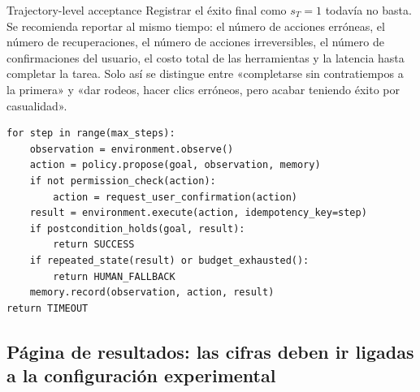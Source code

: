 






\begin{importantbox}{Trajectory-level acceptance}
Registrar el éxito final como $s_T=1$ todavía no basta. Se recomienda reportar al mismo tiempo: el número de acciones erróneas, el número de recuperaciones, el número de acciones irreversibles, el número de confirmaciones del usuario, el costo total de las herramientas y la latencia hasta completar la tarea. Solo así se distingue entre «completarse sin contratiempos a la primera» y «dar rodeos, hacer clics erróneos, pero acabar teniendo éxito por casualidad».
\end{importantbox}

\begin{lstlisting}[caption={Pseudocódigo de verificación y recuperación de trayectorias}]
for step in range(max_steps):
    observation = environment.observe()
    action = policy.propose(goal, observation, memory)
    if not permission_check(action):
        action = request_user_confirmation(action)
    result = environment.execute(action, idempotency_key=step)
    if postcondition_holds(goal, result):
        return SUCCESS
    if repeated_state(result) or budget_exhausted():
        return HUMAN_FALLBACK
    memory.record(observation, action, result)
return TIMEOUT
\end{lstlisting}

\subsection{Página de resultados: las cifras deben ir ligadas a la configuración experimental}

